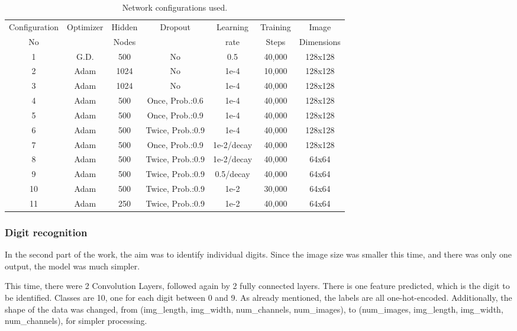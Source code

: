 \documentclass[final,12p,times]{elsarticle}
\begin{document}
\begin{table}[H]
\caption{Network configurations used.}
\centering
\begin{tabular}{ c  c  c  c  c  c  c }
\hline
Configuration& Optimizer & Hidden  & Dropout & Learning  & Training & Image\\
      No     &           & Nodes   &         & rate      & Steps    & Dimensions\\
		 
\hline
1&G.D.&500&No&0.5&40,000&128x128\\
2&Adam&1024&No&1e-4&10,000&128x128\\
3&Adam&1024&No&1e-4&40,000&128x128\\
4&Adam&500&Once, Prob.:0.6&1e-4&40,000&128x128\\
5&Adam&500&Once, Prob.:0.9&1e-4&40,000&128x128\\
6&Adam&500&Twice, Prob.:0.9&1e-4&40,000&128x128\\
7&Adam&500&Once, Prob.:0.9&1e-2/decay&40,000&128x128\\
8&Adam&500&Twice, Prob.:0.9&1e-2/decay&40,000&64x64\\
9&Adam&500&Twice, Prob.:0.9&0.5/decay&40,000&64x64\\
10&Adam&500&Twice, Prob.:0.9&1e-2&30,000&64x64\\
11&Adam&250&Twice, Prob.:0.9&1e-2&40,000&64x64\\
\hline
\end{tabular}
\label{tab:Table 4.1}
\end{table}

\subsubsection{Digit recognition}
\label{sec:4.2.2}
In the second part of the work, the aim was to identify individual digits.
Since the image size was smaller this time, and there was only one output, the model was much simpler.

This time, there were 2 Convolution Layers, followed again by 2 fully connected layers.
There is one feature predicted, which is the digit to be identified.
Classes are 10, one for each digit between 0 and 9.
As already mentioned, the labels are all one-hot-encoded.
Additionally, the shape of the data was changed, from (img\_length, img\_width, num\_channels, num\_images), to 
(num\_images, img\_length, img\_width, num\_channels), for simpler processing.
\end{document}
